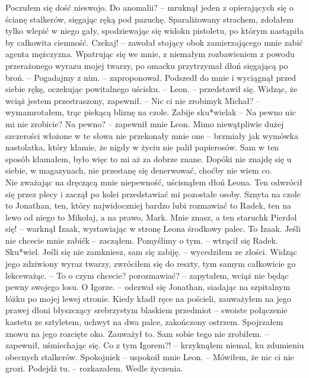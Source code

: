 \documentclass[../MAIN.tex]{subfiles}
\begin{document}
\qd
Poczułem się dość nieswojo.
\sx Do anomalii? -- mruknął jeden z opierających się o ścianę stalkerów, sięgając ręką pod pazuchę.
\qd
Sparaliżowany strachem, zdołałem tylko wlepić w niego gały, spodziewając się widoku pistoletu, po którym nastąpiła by całkowita ciemność.
\sx Czekaj! -- zawołał stojący obok zamierzającego mnie zabić agenta mężczyzna. Wpatrując się we mnie, z niemałym rozbawieniem z powodu przerażonego wyrazu mojej twarzy, po omacku przytrzymał dłoń sięgającą po broń. -- Pogadajmy z nim. -- zaproponował. Podszedł do mnie i wyciągnął przed siebie rękę, oczekując powitalnego uścisku. -- Leon. -- przedstawił się. Widząc, że wciąż jestem przestraszony, zapewnił. -- Nic ci nie zrobimy\3k
\xx Michał? -- wymamrotałem, trąc piekącą bliznę na czole. Zabije sku*wiela\3k -- Na pewno nic mi nie zrobicie?
\xx Na pewno? -- zapewnił mnie Leon.
\qd
Mimo niewątpliwie dużej szczerości włożone w te słowa nie przekonały mnie one -- brzmiały jak wymówka nastolatka, który kłamie, że nigdy w życiu nie palił papierosów. Sam w ten sposób kłamałem, było więc to mi aż za dobrze znane.
Dopóki nie znajdę się u siebie, w magazynach, nie przestanę się denerwować, choćby nie wiem co.\\
Nie zważając na dręczącą mnie niepewność, uścisnąłem dłoń Leona. Ten odwrócił się przez plecy i zaczął po kolei przedstawiać mi pozostałe osoby.
\sx Sznyta na czole to Jonathan, ten, który najwidoczniej bardzo lubi rozmawiać to Radek, ten na lewo od niego to Mikołaj, a na prawo, Mark. Mnie znasz, a ten staruch\3k
\xx Pierdol się! -- warknął Izaak, wystawiając w stronę Leona środkowy palec.
\xx To Izaak.
\xx Jeśli nie chcecie mnie zabić\3k -- zacząłem.
\xx Pomyślimy o tym. -- wtrącił się Radek.
\qd
Sku*wiel.
\sx Jeśli się nie zamkniesz, sam się zabiję. -- wycedziłem ze złości. Widząc jego zdziwiony wyraz twarzy, zwróciłem się do reszty, tym samym całkowicie go lekceważąc. -- To o czym chcecie? porozmawiać? -- zapytałem, wciąż nie będąc pewny swojego losu.
\xx O Igorze. -- odezwał się Jonathan, siadając na szpitalnym łóżku po mojej lewej stronie. Kiedy kładł ręce na pościeli, zauważyłem na jego prawej dłoni błyszczący srebrzystym blaskiem przedmiot -- swoiste połączenie kastetu ze sztyletem, uchwyt na dwa palce, zakończony ostrzem.
\qd
Spojrzałem znowu na jego rozcięte oko. Zauważył to.
\sx Sam sobie tego nie zrobiłem. -- zapewnił, uśmiechając się.
\xx Co z tym Igorem?! -- krzyknąłem niemal, ku zdumieniu obecnych stalkerów.
\xx Spokojnie\3k -- uspokoił mnie Leon. -- Mówiłem, że nic ci nie grozi.
\xx Podejdź tu. -- rozkazałem.
\xx Wedle życzenia.
\qd
\end{document}
